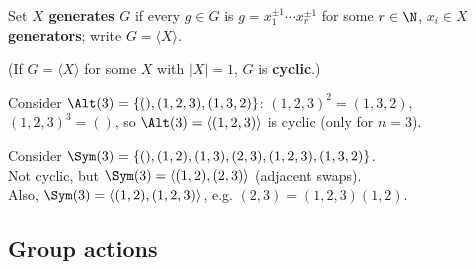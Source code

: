 \begin{slide}
    \begin{definition}[generator]
        \vspace{0pt}
        Set $X$ \textbf{generates} $G$ if every $g \in G$ is $g = x_1^{\pm 1} \dotsb x_r^{\pm 1}$ for some $r \in \N$, $x_i \in X$ \textbf{generators}; write $G = \langle X \rangle$. \pause

        (If $G = \langle X \rangle$ for some $X$ with $|X| = 1$, $G$ is \textbf{cyclic}.)
    \end{definition} \pause

    \begin{example}
        \vspace{0pt}
        Consider $\Alt(3) = \{(),(1,2,3),(1,3,2)\}$: $(1,2,3)^2 = (1,3,2)$, $(1,2,3)^3 = ()$, so $\Alt(3) = \langle(1,2,3)\rangle$ is cyclic (only for $n = 3$).
    \end{example} \pause

    \begin{example}
        \vspace{0pt}
        Consider $\Sym(3) = \{(),(1,2),(1,3),(2,3),(1,2,3),(1,3,2)\}$. \\
        Not cyclic, but $\Sym(3) = \langle(1,2),(2,3)\rangle$ (adjacent swaps). \\
        Also, $\Sym(3) = \langle(1,2),(1,2,3)\rangle$, e.g. $(2,3) = (1,2,3)(1,2)$.
    \end{example}
\end{slide}

\subsection{Group actions}

